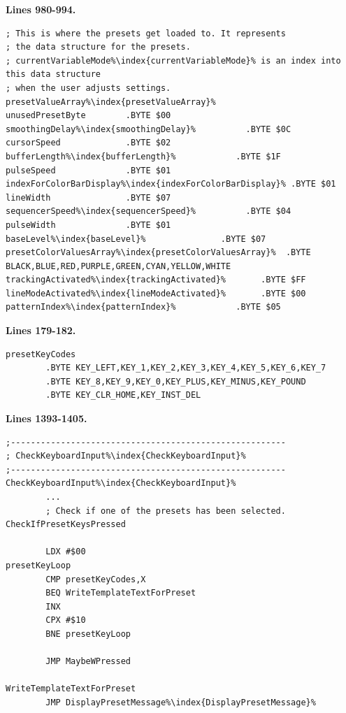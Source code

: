 \clearpage
\textbf{Lines 980-994. }
\begin{lstlisting}[escapechar=\%]
; This is where the presets get loaded to. It represents
; the data structure for the presets.
; currentVariableMode%\index{currentVariableMode}% is an index into this data structure
; when the user adjusts settings.
presetValueArray%\index{presetValueArray}%
unusedPresetByte        .BYTE $00
smoothingDelay%\index{smoothingDelay}%          .BYTE $0C
cursorSpeed             .BYTE $02
bufferLength%\index{bufferLength}%            .BYTE $1F
pulseSpeed              .BYTE $01
indexForColorBarDisplay%\index{indexForColorBarDisplay}% .BYTE $01
lineWidth               .BYTE $07
sequencerSpeed%\index{sequencerSpeed}%          .BYTE $04
pulseWidth              .BYTE $01
baseLevel%\index{baseLevel}%               .BYTE $07
presetColorValuesArray%\index{presetColorValuesArray}%  .BYTE BLACK,BLUE,RED,PURPLE,GREEN,CYAN,YELLOW,WHITE
trackingActivated%\index{trackingActivated}%       .BYTE $FF
lineModeActivated%\index{lineModeActivated}%       .BYTE $00
patternIndex%\index{patternIndex}%            .BYTE $05
\end{lstlisting}

\textbf{Lines 179-182. } 
\begin{lstlisting}[escapechar=\%]
presetKeyCodes
        .BYTE KEY_LEFT,KEY_1,KEY_2,KEY_3,KEY_4,KEY_5,KEY_6,KEY_7
        .BYTE KEY_8,KEY_9,KEY_0,KEY_PLUS,KEY_MINUS,KEY_POUND
        .BYTE KEY_CLR_HOME,KEY_INST_DEL
\end{lstlisting}
\textbf{Lines 1393-1405. } 
\begin{lstlisting}[escapechar=\%]
;-------------------------------------------------------
; CheckKeyboardInput%\index{CheckKeyboardInput}%
;-------------------------------------------------------
CheckKeyboardInput%\index{CheckKeyboardInput}%   
        ...
        ; Check if one of the presets has been selected.
CheckIfPresetKeysPressed   

        LDX #$00
presetKeyLoop   
        CMP presetKeyCodes,X
        BEQ WriteTemplateTextForPreset
        INX 
        CPX #$10
        BNE presetKeyLoop

        JMP MaybeWPressed

WriteTemplateTextForPreset   
        JMP DisplayPresetMessage%\index{DisplayPresetMessage}%
\end{lstlisting}
\clearpage

